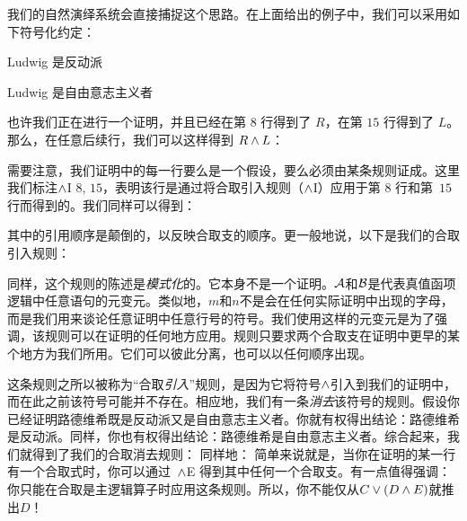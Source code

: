 我们的自然演绎系统会直接捕捉这个思路。在上面给出的例子中，我们可以采用如下符号化约定：


\begin{ekey}
		\item[R] Ludwig 是反动派
		\item[L] Ludwig 是自由意志主义者
	\end{ekey}


也许我们正在进行一个证明，并且已经在第 $8$ 行得到了 $R$，在第 $15$ 行得到了 $L$。那么，在任意后续行，我们可以这样得到 $R \wedge L$：


\begin{fitchproof}
	 
\end{fitchproof}

需要注意，我们证明中的每一行要么是一个假设，要么必须由某条规则证成。这里我们标注$\wedge$I $8$, $15$，表明该行是通过将合取引入规则（$\wedge$I）应用于第 $8$ 行和第~$15$ 行而得到的。我们同样可以得到：


\begin{fitchproof}
	 
\end{fitchproof}


其中的引用顺序是颠倒的，以反映合取支的顺序。更一般地说，以下是我们的合取引入规则：

同样，这个规则的陈述是\emph{模式化}的。它本身不是一个证明。$\mathcal{A}$和$\mathcal{B}$是代表真值函项逻辑中任意语句的元变元。类似地，$m$和$n$不是会在任何实际证明中出现的字母，而是我们用来谈论任意证明中任意行号的符号。我们使用这样的元变元是为了强调，该规则可以在证明的任何地方应用。规则只要求两个合取支在证明中更早的某个地方为我们所用。它们可以彼此分离，也可以以任何顺序出现。

这条规则之所以被称为“合取\emph{引入}”规则，是因为它将符号$\wedge$引入到我们的证明中，而在此之前该符号可能并不存在。相应地，我们有一条\emph{消去}该符号的规则。假设你已经证明路德维希既是反动派又是自由意志主义者。你就有权得出结论：路德维希是反动派。同样，你也有权得出结论：路德维希是自由意志主义者。综合起来，我们就得到了我们的合取消去规则：
同样地：
简单来说就是，当你在证明的某一行有一个合取式时，你可以通过~$\wedge$E 得到其中任何一个合取支。有一点值得强调：你只能在合取是主逻辑算子时应用这条规则。所以，你不能仅从$C \vee (D \wedge E)$就推出$D$！

